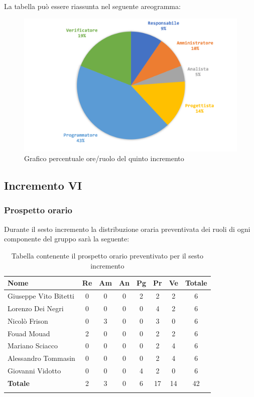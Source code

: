 		La tabella può essere riassunta nel seguente areogramma:
		\begin{figure}[H]
			\centering
			\includegraphics[width=0.8\linewidth]{./images/preventivo/incremento5-2.png}
			\caption{Grafico percentuale ore/ruolo del quinto incremento}
			\label{fig:grafico costi ruolo incremento V}
		\end{figure}
		
		
		
	\subsection{Incremento VI}
		\subsubsection{Prospetto orario}
		Durante il sesto incremento la distribuzione oraria preventivata dei ruoli di ogni componente del gruppo sarà la seguente:
		
		\begin{longtable}{|l|c|c|c|c|c|c|c|}
			\hline
			\rowcolor{lighter-grayer}
			\textbf{Nome} & \textbf{Re} & \textbf{Am} & \textbf{An} & \textbf{Pg}  & \textbf{Pr}   & \textbf{Ve} & \textbf{Totale} \\
			\hline
			\endfirsthead
			
			\hline
			Giuseppe Vito Bitetti 		 & 0 & 0 & 0 & 2 & 2 & 2 & 6\\
			\hline
			\hline
			Lorenzo Dei Negri			 & 0 & 0 & 0 & 0 & 4 & 2 & 6\\
			\hline
			\hline
			Nicolò Frison				      & 0 & 3 & 0 & 0 & 3 & 0 & 6\\
			\hline
			\hline
			Fouad Mouad 				   & 2 & 0 & 0 & 0 & 2 & 2 & 6\\
			\hline
			\hline
			Mariano Sciacco 			 & 0 & 0 & 0 & 0 & 2 & 4 & 6\\
			\hline
			\hline
			Alessandro Tommasin    & 0 & 0 & 0 & 0 & 2 & 4 & 6\\
			\hline
			\hline
			Giovanni Vidotto 			  & 0 & 0 & 0 & 4 & 2 & 0 & 6\\
			\hline 
			\textbf{Totale}			 		& 2 & 3 & 0 & 6 & 17 & 14 & 42\\
			\hline
			\caption{Tabella contenente il prospetto orario preventivato per il sesto incremento}
		\end{longtable}
		\pagebreak
		

